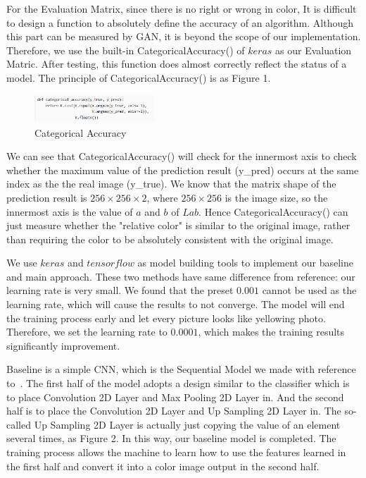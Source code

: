 \documentclass[10pt,twocolumn,letterpaper]{article}
\begin{document}
For the Evaluation Matrix, since there is no right or wrong in color, It is difficult to design a function to absolutely define the accuracy of an algorithm. Although this part can be measured by GAN, it is beyond the scope of our implementation. Therefore, we use the built-in CategoricalAccuracy() of $keras$ as our Evaluation Matric. After testing, this function does almost correctly reflect the status of a model. The principle of CategoricalAccuracy() is as Figure 1.

\begin{figure}[H]
\centering
\includegraphics[width=0.4\textwidth]{fig1}
\caption{Categorical Accuracy}
\end{figure}

We can see that CategoricalAccuracy() will check for the innermost axis to check whether the maximum value of the prediction result (y\_pred) occurs at the same index as the  the real image (y\_true). We know that the matrix shape of the prediction result is $256 \times 256 \times 2$, where $256 \times 256$ is the image size, so the innermost axis is the value of $a$ and $b$ of $Lab$. Hence CategoricalAccuracy() can just measure whether the "relative color" is similar to the original image, rather than requiring the color to be absolutely consistent with the original image.

We use $keras$ and $tensorflow$ as model building tools to implement our baseline and main approach. These two methods have same difference from reference: our learning rate is very small. We found that the preset $0.001$ cannot be used as the learning rate, which will cause the results to not converge. The model will end the training process early and let every picture looks like yellowing photo. Therefore, we set the learning rate to $0.0001$, which makes the training results significantly improvement.

Baseline is a simple CNN, which is the Sequential Model we made with reference to~\cite{CNN}. The first half of the model adopts a design similar to the classifier which is to place Convolution 2D Layer and Max Pooling 2D Layer in. And the second half is to place the Convolution 2D Layer and Up Sampling 2D Layer in. The so-called Up Sampling 2D Layer is actually just copying the value of an element several times, as Figure 2. In this way, our baseline model is completed. The training process allows the machine to learn how to use the features learned in the first half and convert it into a color image output in the second half.
\end{document}
